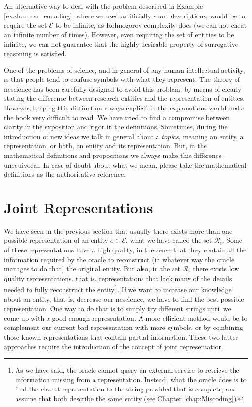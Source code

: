 An alternative way to deal with the problem described in Example \ref{ex:shannon_encoding}, where we used artificially short descriptions, would be to require the set $\mathcal{E}$ to be infinite, as Kolmogorov complexity does (we can not cheat an infinite number of times). However, even requiring the set of entities to be infinite, we can not guarantee that the highly desirable property of surrogative reasoning is satisfied.

One of the problems of science, and in general of any human intellectual activity, is that people tend to confuse symbols with what they represent. The theory of nescience has been carefully designed to avoid this problem, by means of clearly stating the difference between research entities and the representation of entities. However, keeping this distinction always explicit in the explanations would make the book very difficult to read. We have tried to find a compromise between clarity in the exposition and rigor in the definitions. Sometimes, during the introduction of new ideas we talk in general about a \emph{topics}, meaning an entity, a representation, or both, an entity and its representation. But, in the mathematical definitions and propositions we always make this difference unequivocal. In case of doubt about what we mean, please take the mathematical definitions as the authoritative reference. 

%
%

\section{Joint Representations}
\label{sec:descriptions_joint_topic}

We have seen in the previous section that usually there exists more than one possible representation of an entity $e \in \mathcal{E}$, what we have called the set $\mathcal{R}_e$. Some of these representations have a high quality, in the sense that they contain all the information required by the oracle to reconstruct (in whatever way the oracle manages to do that) the original entity. But also, in the set $\mathcal{R}_e$ there exists low quality representations, that is, representations that lack many of the details needed to fully reconstruct the entity\footnote{As we have said, the oracle cannot query an external service to retrieve the information missing from a representation. Instead, what the oracle does is to find the closest representation to the string provided that is complete, and assume that both describe the same entity (see Chapter \ref{chap:Miscoding}).}. If we want to increase our knowledge about an entity, that is, decrease our nescience, we have to find the best possible representation. One way to do that is to simply try different strings until we come up with a good enough representation. A more efficient method would be to complement our current bad representation with more symbols, or by combining those known representations that contain partial information. These two latter approaches require the introduction of the concept of joint representation.

